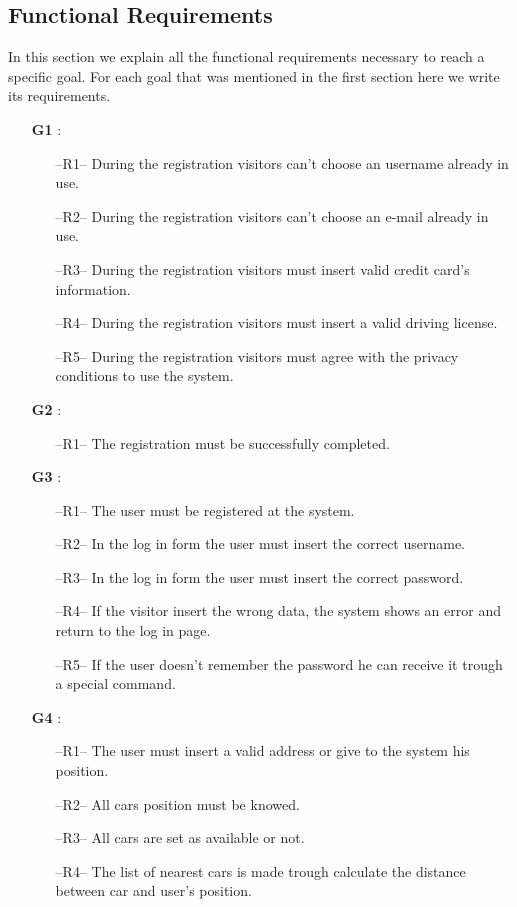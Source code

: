 \subsection{Functional Requirements} \label{sec:funct_requirements}
In this section we explain all the functional requirements necessary to reach a specific goal. For each goal that was mentioned in the first section here we write its requirements.
\begin{itemize}
\item[\textbf{G1}]: 
\begin{itemize}
\item[--R1--] During the registration visitors can't choose an username already in use.
\item[--R2--] During the registration visitors can't choose an e-mail already in use.
\item[--R3--] During the registration visitors must insert valid credit card's information.
\item[--R4--] During the registration visitors must insert a valid driving license.
\item[--R5--] During the registration visitors must agree with the privacy conditions to use the system.
\end{itemize}

\item[\textbf{G2}]:
\begin{itemize}
\item[--R1--] The registration must be successfully completed.
\end{itemize}

\item[\textbf{G3}]:
\begin{itemize}
\item[--R1--] The user must be registered at the system.
\item[--R2--] In the log in form the user must insert the correct username.
\item[--R3--] In the log in form the user must insert the correct password.
\item[--R4--] If the visitor insert the wrong data, the system shows an error and return to the log in page.
\item[--R5--] If the user doesn't remember the password he can receive it trough a special command.
\end{itemize}

\item[\textbf{G4}]:
\begin{itemize}
\item[--R1--] The user must insert a valid address or give to the system his position.
\item[--R2--] All cars position must be knowed.
\item[--R3--] All cars are set as available or not.
\item[--R4--] The list of nearest cars is made trough calculate the distance between car and user's position.
\end{itemize}


\end{itemize}
